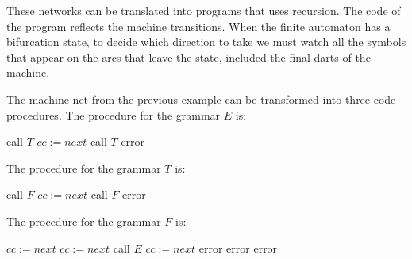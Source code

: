 These networks can be translated into programs that uses recursion. 
The code of the program reflects the machine transitions. 
When the finite automaton has a bifurcation state, to decide which direction to take we must watch all the symbols that appear on the arcs that leave the state, included the final darts of the machine.
\begin{example}
    The machine net from the previous example can be transformed into three code procedures. 
    The procedure for the grammar $E$ is: 
    \begin{algorithmic}[1]
        \State call $T$
            \State $cc:=next$
            \State call $T$
        \EndWhile
            \State \Return
        \Else 
            \State error
        \EndIf
    \end{algorithmic}
    The procedure for the grammar $T$ is: 
    \begin{algorithmic}[1]
        \State call $F$
            \State $cc:=next$
            \State call $F$
        \EndWhile
            \State \Return
        \Else 
            \State error
        \EndIf
    \end{algorithmic}
    The procedure for the grammar $F$ is: 
    \begin{algorithmic}[1]
            \State $cc:=next$
            \State $cc:=next$
            \State call $E$
                \State $cc:=next$
                    \State \Return
                \Else 
                    \State error
                \EndIf
            \Else 
                \State error
            \EndIf
        \Else 
            \State error
        \EndIf
    \end{algorithmic}
\end{example}